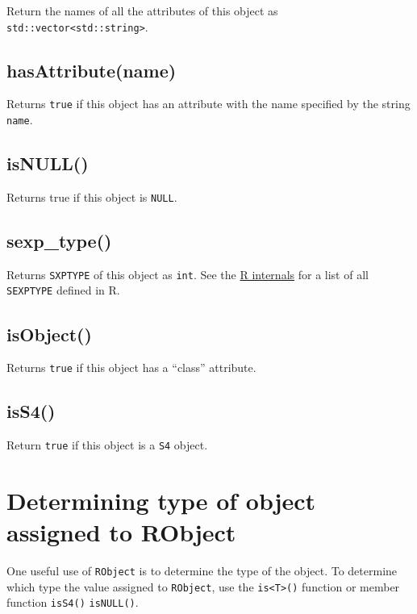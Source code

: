 \documentclass[]{book}
\begin{document}
Return the names of all the attributes of this object as \texttt{std::vector\textless{}std::string\textgreater{}}.

\hypertarget{hasattributename}{%
\subsection{hasAttribute(name)}\label{hasattributename}}

Returns \texttt{true} if this object has an attribute with the name specified by the string \texttt{name}.

\hypertarget{isnull}{%
\subsection{isNULL()}\label{isnull}}

Returns true if this object is \texttt{NULL}.

\hypertarget{sexp_type}{%
\subsection{sexp\_type()}\label{sexp_type}}

Returns \texttt{SXPTYPE} of this object as \texttt{int}. See the \href{https://cran.r-project.org/doc/manuals/r-release/R-ints.html\#SEXPTYPEs}{R internals} for a list of all \texttt{SEXPTYPE} defined in R.

\hypertarget{isobject}{%
\subsection{isObject()}\label{isobject}}

Returns \texttt{true} if this object has a ``class'' attribute.

\hypertarget{iss4}{%
\subsection{isS4()}\label{iss4}}

Return \texttt{true} if this object is a \texttt{S4} object.

\hypertarget{determining-type-of-object-assigned-to-robject}{%
\section{Determining type of object assigned to RObject}\label{determining-type-of-object-assigned-to-robject}}

One useful use of \texttt{RObject} is to determine the type of the object. To determine which type the value assigned to \texttt{RObject}, use the \texttt{is\textless{}T\textgreater{}()} function or member function \texttt{isS4()} \texttt{isNULL()}.
\end{document}
